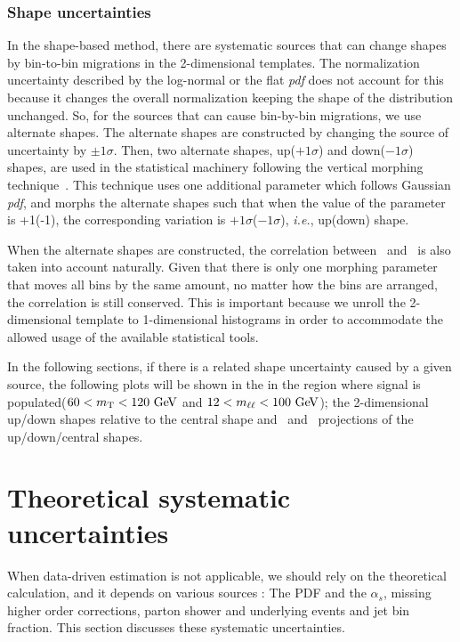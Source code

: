 \subsubsection{Shape uncertainties}

In the shape-based method, there are systematic sources that can change shapes 
by bin-to-bin migrations in the 2-dimensional templates. 
The normalization uncertainty described by the log-normal or the flat \textit{pdf}  
does not account for this because it changes the overall normalization 
keeping the shape of the distribution unchanged. So, for the sources that can cause 
bin-by-bin migrations, we use alternate shapes.  
The alternate shapes are constructed by changing the source of uncertainty 
by $\pm 1\sigma$. Then, two alternate shapes, up($+1\sigma$) and down($-1\sigma$) shapes,
are used in the statistical machinery following the vertical morphing 
technique~\cite{2011arXiv1103.0354C}. 
This technique uses one additional parameter which follows Gaussian \textit{pdf},
and morphs the alternate shapes such that when the value of the parameter 
is +1(-1), the corresponding variation is $+1\sigma$($-1\sigma$), 
\textit{i.e.}, up(down) shape. 

When the alternate shapes are constructed, 
the correlation between \mT\ and \mll\ is also taken into account naturally.  
Given that there is only one morphing parameter that moves all bins 
by the same amount,  
no matter how the bins are arranged, the correlation is still conserved.  
This is important because we unroll the 2-dimensional template to 1-dimensional 
histograms in order to accommodate the allowed usage of the available statistical tools. 

In the following sections, if there is a related shape uncertainty
caused by a given source, the following plots will be shown in the
in the region where signal is populated($60<m_{\mathrm{T}}<120~\mathrm{Ge\kern -0.1em V}$ and $12<m_{\ell\ell}<100~\mathrm{Ge\kern -0.1em V}$); 
the 2-dimensional up/down shapes relative to the central shape 
and \mT\ and \mll\ projections of the up/down/central shapes. 

\section{Theoretical systematic uncertainties}

When data-driven estimation is not applicable, we should rely on the theoretical 
calculation, and it depends on various sources : The PDF and the $\alpha_s$,  
missing higher order corrections, parton shower and underlying events 
and jet bin fraction. 
This section discusses these systematic uncertainties. 

